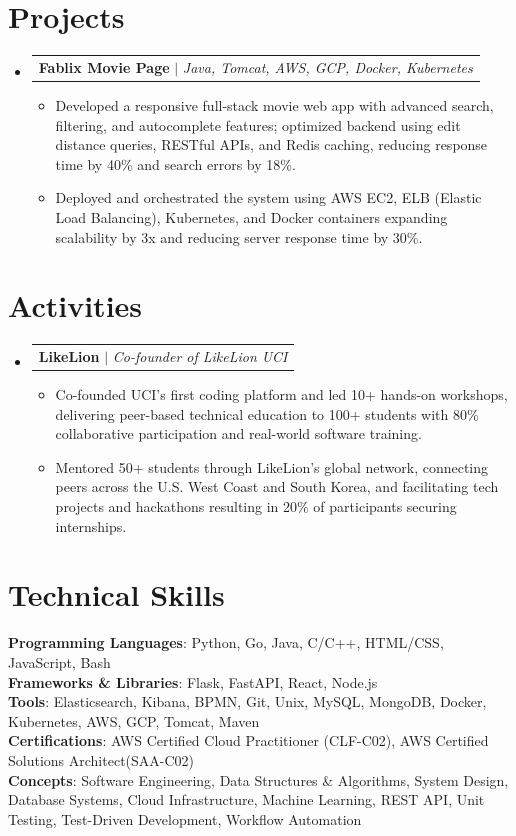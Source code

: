 \documentclass[letterpaper,11pt]{article}
\newcommand{\resumeItem}[1]{
  \item\small{
    {#1 \vspace{-2pt}}
  }
}
\newcommand{\resumeProjectHeading}[1]{
  \item
    \begin{tabular*}{0.97\textwidth}{l}
      \small#1 \\
    \end{tabular*}\vspace{-7pt}
}
\newcommand{\resumeSubHeadingListStart}{\begin{itemize}[leftmargin=0.15in, label={}]}
\newcommand{\resumeSubHeadingListEnd}{\end{itemize}}
\newcommand{\resumeItemListStart}{\begin{itemize}}
\newcommand{\resumeItemListEnd}{\end{itemize}\vspace{-5pt}}
\begin{document}
\section{Projects}
    \resumeSubHeadingListStart
      \resumeProjectHeading
          {\textbf{Fablix Movie Page} $|$ \emph{Java, Tomcat, AWS, GCP, Docker, Kubernetes}}
          \resumeItemListStart
            \resumeItem{Developed a responsive full-stack movie web app with advanced search, filtering, and autocomplete features; 
                        optimized backend using edit distance queries, RESTful APIs, and Redis caching, reducing response time by 40\% and search errors by 18\%.}
            \resumeItem{Deployed and orchestrated the system using  AWS EC2, ELB (Elastic Load Balancing),
                            Kubernetes, and Docker containers expanding scalability by 3x and reducing server response time by 30\%.}
          \resumeItemListEnd
    \resumeSubHeadingListEnd


\section{Activities}
    \resumeSubHeadingListStart
      \resumeProjectHeading
          {\textbf{LikeLion} $|$ \emph{Co-founder of LikeLion UCI}}
          \resumeItemListStart
            \resumeItem{Co-founded UCI’s first coding platform and led 10+ hands-on workshops, delivering peer-based technical education to 100+ 
                            students with 80\% collaborative participation and real-world software training.}
            \resumeItem{Mentored 50+ students through LikeLion’s global network, connecting peers across the U.S. West Coast and South Korea, 
                            and facilitating tech projects and hackathons resulting in 20\% of participants securing internships.}
        \resumeItemListEnd
    \resumeSubHeadingListEnd


%
\section{Technical Skills}
 \begin{itemize}[leftmargin=0.15in, label={}]
    \small{\item{
     \textbf{Programming Languages}{: Python, Go, Java, C/C++, HTML/CSS, JavaScript, Bash} \\
     \textbf{Frameworks \& Libraries}{: Flask, FastAPI, React, Node.js} \\
     \textbf{Tools}{: Elasticsearch, Kibana, BPMN, Git, Unix, MySQL, MongoDB, Docker, Kubernetes, AWS, GCP, Tomcat, Maven} \\
     \textbf{Certifications}{: AWS Certified Cloud Practitioner (CLF-C02), AWS Certified Solutions Architect(SAA-C02) } \\
     \textbf{Concepts}{: Software Engineering, Data Structures \& Algorithms, System Design, Database Systems, Cloud 
                            Infrastructure, Machine Learning, REST API, Unit Testing, Test-Driven Development, Workflow Automation}
    }}
 \end{itemize}


\end{document}
